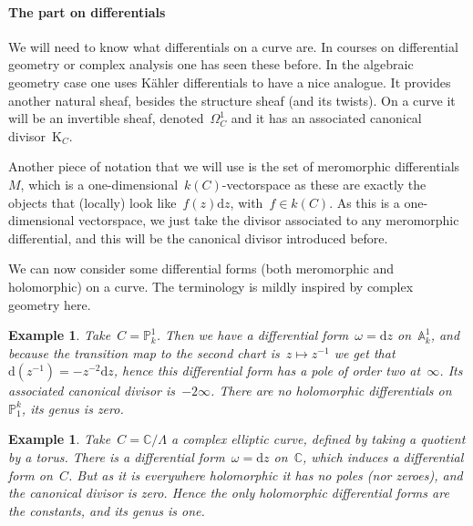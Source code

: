 \documentclass[10pt,a4paper]{article}
\theoremstyle{lecture}
\newtheorem{example}[theorem]{Example}
\newcommand\dash{\nobreakdash-\hspace{0pt}}
\newcommand\dd{\mathrm{d}}
\begin{document}
\paragraph{The part on differentials}
We will need to know what differentials on a curve are. In courses on differential geometry or complex analysis one has seen these before. In the algebraic geometry case one uses K\"ahler differentials to have a nice analogue. It provides another natural sheaf, besides the structure sheaf (and its twists). On a curve it will be an invertible sheaf, denoted~$\Omega_C^1$ and it has an associated canonical divisor~$\mathrm{K}_C$.

Another piece of notation that we will use is the set of meromorphic differentials~$M$, which is a one-dimensional~$k(C)$\dash vectorspace as these are exactly the objects that (locally) look like~$f(z)\dd z$, with~$f\in k(C)$. As this is a one-dimensional vectorspace, we just take the divisor associated to any meromorphic differential, and this will be the canonical divisor introduced before.

We can now consider some differential forms (both meromorphic and holomorphic) on a curve. The terminology is mildly inspired by complex geometry here.
\begin{example}
  Take~$C=\mathbb{P}_k^1$. Then we have a differential form~$\omega=\dd z$ on~$\mathbb{A}_k^1$, and because the transition map to the second chart is~$z\mapsto z^{-1}$ we get that~$\dd(z^{-1})=-z^{-2}\dd z$, hence this differential form has a pole of order two at~$\infty$. Its associated canonical divisor is~$-2\infty$. There are no holomorphic differentials on~$\mathbb{P}_1^k$, its genus is zero.
\end{example}
\begin{example}
  Take~$C=\mathbb{C}/\Lambda$ a complex elliptic curve, defined by taking a quotient by a torus. There is a differential form~$\omega=\dd z$ on~$\mathbb{C}$, which induces a differential form on~$C$. But as it is everywhere holomorphic it has no poles (nor zeroes), and the canonical divisor is zero. Hence the only holomorphic differential forms are the constants, and its genus is one.
\end{example}
\end{document}
